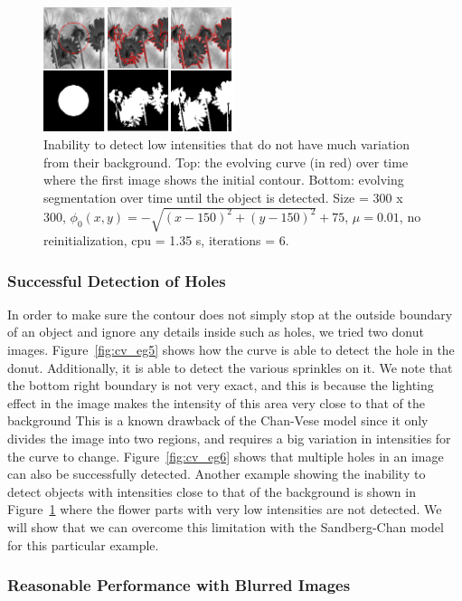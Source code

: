 \documentclass[10pt,twocolumn,letterpaper]{article}
\begin{document}
\begin{figure}[t]
\centering
\includegraphics[width=0.5\textwidth]{cv_eg7.png}
\caption{Inability to detect low intensities that do not have much variation from their background.  Top: the evolving curve (in red) over time where the
first
image shows the initial
contour. Bottom: evolving segmentation over time until the object is detected. Size = 300 x 300, $\phi_{0}(x,y) = - \sqrt{(x - 150)^2 + (y - 150)^2} + 75$,
$\mu =0.01$, no reinitialization, cpu = 1.35 s, iterations = 6.}
\label{fig:cv_eg7}
\end{figure}



\subsubsection*{Successful Detection of Holes}

In order to make sure the contour does not simply stop at the outside boundary of an object and ignore any details inside such as holes, we tried two donut
images. Figure~\ref{fig:cv_eg5} shows how the curve is able to detect the hole in the donut. Additionally, it is able to detect the various sprinkles on it.
We note that the bottom right boundary is not very exact, and this is because the lighting effect in the image makes the intensity of this area very close to
that of the background This is a known drawback of the Chan-Vese model since it only divides the image into two regions, and requires a big variation in
intensities for the curve to change. Figure~\ref{fig:cv_eg6} shows that multiple holes in an image can also be successfully detected. Another example showing
the inability to detect objects with intensities close to that of the background is shown in Figure~\ref{fig:cv_eg7} where the flower parts with very low
intensities are not detected. We will show that we can overcome this limitation with the Sandberg-Chan model for this particular example.


\subsubsection*{Reasonable Performance with Blurred Images}
\end{document}
